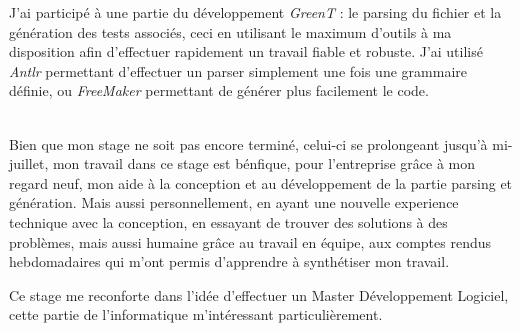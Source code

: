 \documentclass[a4paper, 12pt]{article}
\begin{document}
	J'ai participé à une partie du développement \textit{GreenT} : le parsing du fichier et la génération des tests associés, ceci en utilisant le maximum d'outils à ma
	disposition afin d'effectuer rapidement un travail fiable et robuste. J'ai utilisé \textit{Antlr} permettant d'effectuer un parser simplement une fois
	une grammaire définie, ou \textit{FreeMaker} permettant de générer plus facilement le code.\\~

	Bien que mon stage ne soit pas encore terminé, celui-ci se prolongeant jusqu'à mi-juillet, mon travail dans ce stage est bénfique, pour l'entreprise grâce à mon regard neuf, mon aide à la conception et au développement de la partie parsing et génération. Mais aussi personnellement, en ayant une nouvelle experience technique avec la conception, en essayant de trouver des solutions à des problèmes, mais aussi humaine grâce au travail en équipe, aux comptes rendus hebdomadaires qui m'ont permis d'apprendre à synthétiser mon travail.

	Ce stage me reconforte dans l'idée d'effectuer un Master Développement Logiciel, cette partie de l'informatique m'intéressant particulièrement.
\end{document}
